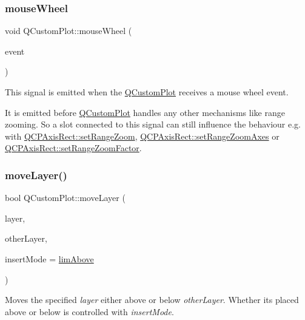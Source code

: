 \subsubsection{\texorpdfstring{mouse\+Wheel}{mouseWheel}}
{\footnotesize\ttfamily void Q\+Custom\+Plot\+::mouse\+Wheel (\begin{DoxyParamCaption}\item[{Q\+Wheel\+Event $\ast$}]{event }\end{DoxyParamCaption})\hspace{0.3cm}{\ttfamily [signal]}}

This signal is emitted when the \hyperlink{class_q_custom_plot}{Q\+Custom\+Plot} receives a mouse wheel event.

It is emitted before \hyperlink{class_q_custom_plot}{Q\+Custom\+Plot} handles any other mechanisms like range zooming. So a slot connected to this signal can still influence the behaviour e.\+g. with \hyperlink{class_q_c_p_axis_rect_a7960a9d222f1c31d558b064b60f86a31}{Q\+C\+P\+Axis\+Rect\+::set\+Range\+Zoom}, \hyperlink{class_q_c_p_axis_rect_a9442cca2aa358405f39a64d51eca13d2}{Q\+C\+P\+Axis\+Rect\+::set\+Range\+Zoom\+Axes} or \hyperlink{class_q_c_p_axis_rect_a895d7ac745ea614e04056244b3c138ac}{Q\+C\+P\+Axis\+Rect\+::set\+Range\+Zoom\+Factor}. \mbox{\label{class_q_custom_plot_ae896140beff19424e9e9e02d6e331104}} 
\subsubsection{\texorpdfstring{move\+Layer()}{moveLayer()}}
{\footnotesize\ttfamily bool Q\+Custom\+Plot\+::move\+Layer (\begin{DoxyParamCaption}\item[{\hyperlink{class_q_c_p_layer}{Q\+C\+P\+Layer} $\ast$}]{layer,  }\item[{\hyperlink{class_q_c_p_layer}{Q\+C\+P\+Layer} $\ast$}]{other\+Layer,  }\item[{\hyperlink{class_q_custom_plot_a75a8afbe6ef333b1f3d47abb25b9add7}{Q\+Custom\+Plot\+::\+Layer\+Insert\+Mode}}]{insert\+Mode = {\ttfamily \hyperlink{class_q_custom_plot_a75a8afbe6ef333b1f3d47abb25b9add7a062b0b7825650b432a713c0df6742d41}{lim\+Above}} }\end{DoxyParamCaption})}

Moves the specified {\itshape layer} either above or below {\itshape other\+Layer}. Whether it\textquotesingle{}s placed above or below is controlled with {\itshape insert\+Mode}.

